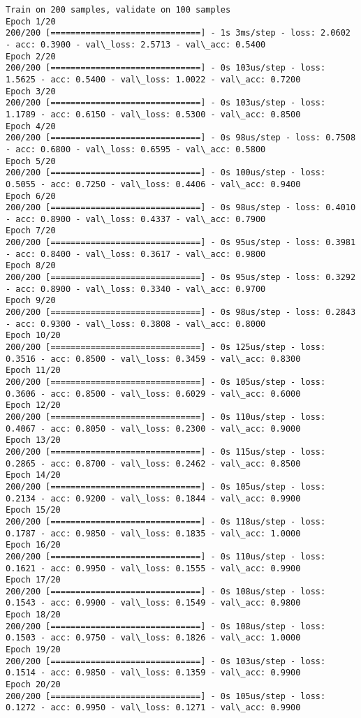 \documentclass[11pt]{article}
\begin{document}
    \begin{Verbatim}[commandchars=\\\{\}]
Train on 200 samples, validate on 100 samples
Epoch 1/20
200/200 [==============================] - 1s 3ms/step - loss: 2.0602 - acc: 0.3900 - val\_loss: 2.5713 - val\_acc: 0.5400
Epoch 2/20
200/200 [==============================] - 0s 103us/step - loss: 1.5625 - acc: 0.5400 - val\_loss: 1.0022 - val\_acc: 0.7200
Epoch 3/20
200/200 [==============================] - 0s 103us/step - loss: 1.1789 - acc: 0.6150 - val\_loss: 0.5300 - val\_acc: 0.8500
Epoch 4/20
200/200 [==============================] - 0s 98us/step - loss: 0.7508 - acc: 0.6800 - val\_loss: 0.6595 - val\_acc: 0.5800
Epoch 5/20
200/200 [==============================] - 0s 100us/step - loss: 0.5055 - acc: 0.7250 - val\_loss: 0.4406 - val\_acc: 0.9400
Epoch 6/20
200/200 [==============================] - 0s 98us/step - loss: 0.4010 - acc: 0.8900 - val\_loss: 0.4337 - val\_acc: 0.7900
Epoch 7/20
200/200 [==============================] - 0s 95us/step - loss: 0.3981 - acc: 0.8400 - val\_loss: 0.3617 - val\_acc: 0.9800
Epoch 8/20
200/200 [==============================] - 0s 95us/step - loss: 0.3292 - acc: 0.8900 - val\_loss: 0.3340 - val\_acc: 0.9700
Epoch 9/20
200/200 [==============================] - 0s 98us/step - loss: 0.2843 - acc: 0.9300 - val\_loss: 0.3808 - val\_acc: 0.8000
Epoch 10/20
200/200 [==============================] - 0s 125us/step - loss: 0.3516 - acc: 0.8500 - val\_loss: 0.3459 - val\_acc: 0.8300
Epoch 11/20
200/200 [==============================] - 0s 105us/step - loss: 0.3606 - acc: 0.8500 - val\_loss: 0.6029 - val\_acc: 0.6000
Epoch 12/20
200/200 [==============================] - 0s 110us/step - loss: 0.4067 - acc: 0.8050 - val\_loss: 0.2300 - val\_acc: 0.9000
Epoch 13/20
200/200 [==============================] - 0s 115us/step - loss: 0.2865 - acc: 0.8700 - val\_loss: 0.2462 - val\_acc: 0.8500
Epoch 14/20
200/200 [==============================] - 0s 105us/step - loss: 0.2134 - acc: 0.9200 - val\_loss: 0.1844 - val\_acc: 0.9900
Epoch 15/20
200/200 [==============================] - 0s 118us/step - loss: 0.1787 - acc: 0.9850 - val\_loss: 0.1835 - val\_acc: 1.0000
Epoch 16/20
200/200 [==============================] - 0s 110us/step - loss: 0.1621 - acc: 0.9950 - val\_loss: 0.1555 - val\_acc: 0.9900
Epoch 17/20
200/200 [==============================] - 0s 108us/step - loss: 0.1543 - acc: 0.9900 - val\_loss: 0.1549 - val\_acc: 0.9800
Epoch 18/20
200/200 [==============================] - 0s 108us/step - loss: 0.1503 - acc: 0.9750 - val\_loss: 0.1826 - val\_acc: 1.0000
Epoch 19/20
200/200 [==============================] - 0s 103us/step - loss: 0.1514 - acc: 0.9850 - val\_loss: 0.1359 - val\_acc: 0.9900
Epoch 20/20
200/200 [==============================] - 0s 105us/step - loss: 0.1272 - acc: 0.9950 - val\_loss: 0.1271 - val\_acc: 0.9900

    \end{Verbatim}
\end{document}
